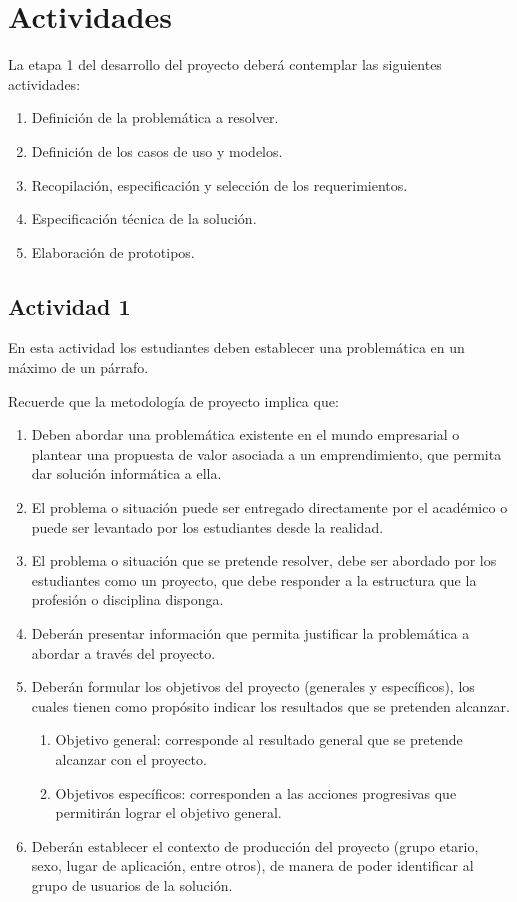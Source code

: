 \documentclass[]{article}
\begin{document}
\section{Actividades}

La etapa 1 del desarrollo del proyecto deberá contemplar las siguientes actividades:

\begin{enumerate}
    \item Definición de la problemática a resolver.
    \item Definición de los casos de uso y modelos.
    \item Recopilación, especificación y selección de los requerimientos.
    \item Especificación técnica de la solución.
    \item Elaboración de prototipos.
\end{enumerate}

\subsection{Actividad 1}

En esta actividad los estudiantes deben establecer una problemática en un máximo de un párrafo.

Recuerde que la metodología de proyecto implica que:

\begin{enumerate}
    \item Deben abordar una problemática existente en el mundo empresarial o plantear una propuesta de valor asociada a un emprendimiento, que permita dar solución informática a ella. 
    \item El problema o situación puede ser entregado directamente por el académico o puede ser levantado por los estudiantes desde la realidad.
    \item El problema o situación que se pretende resolver, debe ser abordado por los estudiantes como un proyecto, que debe responder a la estructura que la profesión o disciplina disponga.
    \item Deberán  presentar información que permita justificar la problemática a abordar a través del proyecto. 
    \item Deberán formular los objetivos del proyecto (generales y específicos), los cuales tienen como propósito indicar los resultados que se pretenden alcanzar. 
    \begin{enumerate}
        \item Objetivo general: corresponde al resultado general que se pretende alcanzar con el proyecto. 
        \item Objetivos específicos: corresponden a las acciones progresivas que permitirán lograr el objetivo general. 
    \end{enumerate}
    \item Deberán establecer el contexto de producción del proyecto (grupo etario, sexo, lugar de aplicación, entre otros), de manera de poder identificar al grupo de usuarios de la solución. 
\end{enumerate}
\end{document}
